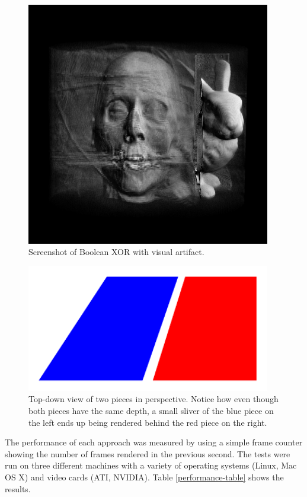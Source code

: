 \documentclass{report}
\begin{document}
\begin{figure}
\centering
\includegraphics[width=0.95\textwidth]{boolean-xor-screenshot-3.png}
\caption{Screenshot of Boolean XOR with visual artifact.}
\label{boolean-xor-with-artifact}
\end{figure}

\begin{figure}
\centering
\includegraphics[width=0.95\textwidth]{pieces-in-perspective.pdf}
\caption{Top-down view of two pieces in perspective.  Notice how even though
both pieces have the same depth, a small sliver of the blue piece on the left
ends up being rendered behind the red piece on the right.}
\label{pieces-in-perspective}
\end{figure}

The performance of each approach was measured by using a simple frame counter
showing the number of frames rendered in the previous second.  The tests were
run on three different machines with a variety of operating systems (Linux, Mac
OS X) and video cards (ATI, NVIDIA).  Table \ref{performance-table} shows the
results.
\end{document}
